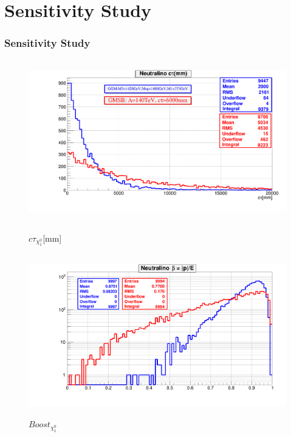 \documentclass[12pt]{beamer}
\begin{document}
\section{Sensitivity Study}
\begin{frame}
\frametitle{Sensitivity Study}

\begin{figure}[ht]

\begin{minipage}[b]{0.45\linewidth}
\centering
\includegraphics[height=7cm, width=\textwidth]{PLOTS/GMSB_Vs_GGM_Neutralino_ctau.png}
\caption{$c\tau_{\chi^{0}_{1}}$[mm]}
\label{fig:Weak SUSY Production}
\end{minipage}
\begin{minipage}[b]{0.45\linewidth}
\centering
\includegraphics[height=7cm,width=\textwidth]{PLOTS/GMSB_Vs_GGM_Neutralino_Boost.png}
\caption{$Boost_{\chi^{0}_{1}}$ }
\label{fig:Strong SUSY Production}
\end{minipage}
\end{figure}

\end{frame}
\end{document}
